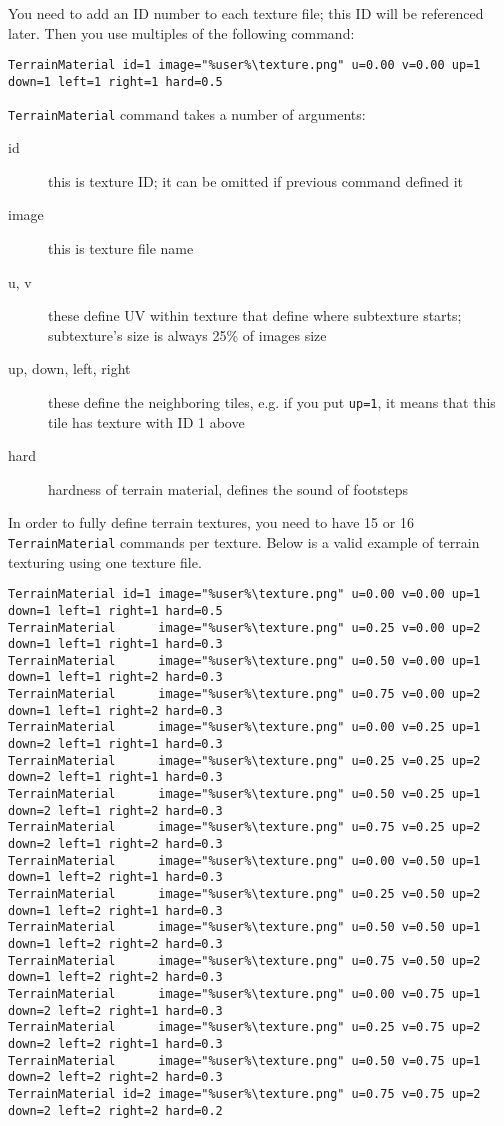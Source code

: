 You need to add an ID number to each texture file; this ID will be referenced later. Then you use multiples of the following command:

\begin{lstlisting}[style=scene]
TerrainMaterial id=1 image="%user%\texture.png" u=0.00 v=0.00 up=1 down=1 left=1 right=1 hard=0.5
\end{lstlisting}

\texttt{TerrainMaterial} command takes a number of arguments:

\begin{description}
    \item[id] this is texture ID; it can be omitted if previous command defined it
    \item[image] this is texture file name
    \item[u, v] these define UV within texture that define where subtexture starts; subtexture's size is always 25\% of images size
    \item[up, down, left, right] these define the neighboring tiles, e.g. if you put \texttt{up=1}, it means that this tile has texture with ID 1 above
    \item[hard] hardness of terrain material, defines the sound of footsteps
\end{description}

In order to fully define terrain textures, you need to have 15 or 16 \texttt{TerrainMaterial} commands per texture. Below is a valid example of terrain texturing using one texture file.

\begin{lstlisting}[style=scene]
TerrainMaterial id=1 image="%user%\texture.png" u=0.00 v=0.00 up=1 down=1 left=1 right=1 hard=0.5
TerrainMaterial      image="%user%\texture.png" u=0.25 v=0.00 up=2 down=1 left=1 right=1 hard=0.3
TerrainMaterial      image="%user%\texture.png" u=0.50 v=0.00 up=1 down=1 left=1 right=2 hard=0.3
TerrainMaterial      image="%user%\texture.png" u=0.75 v=0.00 up=2 down=1 left=1 right=2 hard=0.3
TerrainMaterial      image="%user%\texture.png" u=0.00 v=0.25 up=1 down=2 left=1 right=1 hard=0.3
TerrainMaterial      image="%user%\texture.png" u=0.25 v=0.25 up=2 down=2 left=1 right=1 hard=0.3
TerrainMaterial      image="%user%\texture.png" u=0.50 v=0.25 up=1 down=2 left=1 right=2 hard=0.3
TerrainMaterial      image="%user%\texture.png" u=0.75 v=0.25 up=2 down=2 left=1 right=2 hard=0.3
TerrainMaterial      image="%user%\texture.png" u=0.00 v=0.50 up=1 down=1 left=2 right=1 hard=0.3
TerrainMaterial      image="%user%\texture.png" u=0.25 v=0.50 up=2 down=1 left=2 right=1 hard=0.3
TerrainMaterial      image="%user%\texture.png" u=0.50 v=0.50 up=1 down=1 left=2 right=2 hard=0.3
TerrainMaterial      image="%user%\texture.png" u=0.75 v=0.50 up=2 down=1 left=2 right=2 hard=0.3
TerrainMaterial      image="%user%\texture.png" u=0.00 v=0.75 up=1 down=2 left=2 right=1 hard=0.3
TerrainMaterial      image="%user%\texture.png" u=0.25 v=0.75 up=2 down=2 left=2 right=1 hard=0.3
TerrainMaterial      image="%user%\texture.png" u=0.50 v=0.75 up=1 down=2 left=2 right=2 hard=0.3
TerrainMaterial id=2 image="%user%\texture.png" u=0.75 v=0.75 up=2 down=2 left=2 right=2 hard=0.2
\end{lstlisting}

